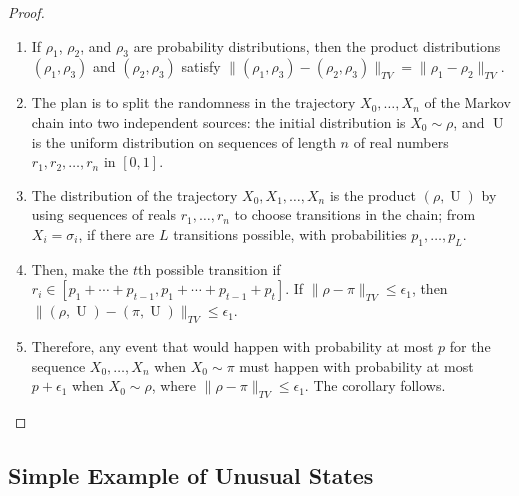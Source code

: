 \documentclass[12pt]{article}
\begin{document}
\begin{proof}
    \begin{enumerate}
        \item
            If \( \rho_1 \), \( \rho_{2} \), and \( \rho_3 \) are
            probability distributions, then the product distributions \(
            (\rho_1 , \rho_3 ) \) and \( (\rho_2 , \rho_3 ) \) satisfy \(
            \| (\rho_1 , \rho_3 )- (\rho_2, \rho_3 )\|_{TV} = \|\rho_1-
            \rho_2 \|_{TV} \).%
        \item
            The plan is to split the randomness in the trajectory \( X_0,
            \dots , X_n \) of the Markov chain into two independent
            sources:  the initial distribution is \( X_0 \sim \rho \),
            and \(
            \operatorname{U}
            \) is the uniform distribution on sequences of length \( n \)
            of real numbers \( r_1 , r_2, \dots, r_n \) in \( [0, 1] \).
        \item
            The distribution of the trajectory \( X_0 , X_1,\dots, X_n \)
            is the product \( (\rho,
            \operatorname{U}
            ) \) by using sequences of reals \( r_1, \dots, r_n \) to
            choose transitions in the chain; from \( X_i = \sigma_i \),
            if there are \( L \) transitions possible, with
            probabilities \( p_1, \dots, p_L \).
        \item
            Then, make the \( t \)th possible transition if \( r_i \in [p_1
            + \cdots + p_{t-1}, p_1 + \cdots + p_{t-1 }+ p_t] \).  If \(
            \|\rho- \pi\|_{TV} \le \epsilon_1 \), then \( \|(\rho,
            \operatorname{U}
            )- (\pi,
            \operatorname{U}
            )\|_{TV} \le \epsilon_1 \).
        \item
            Therefore, any event that would happen with probability at
            most \( p \) for the sequence \( X_0 ,\dots, X_n \) when \(
            X_0 \sim \pi \) must happen with probability at most \( p +
            \epsilon_1 \) when \( X_0 \sim \rho \), where \( \|\rho- \pi\|_
            {TV} \le \epsilon_1 \).  The corollary follows.
    \end{enumerate}
\end{proof}

\subsection*{Simple Example of Unusual States}
\end{document}
